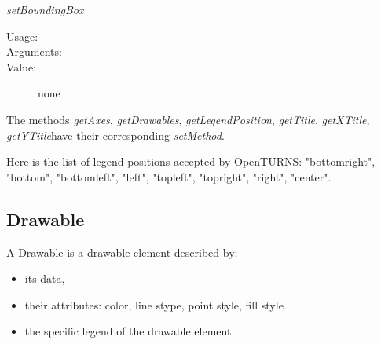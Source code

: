 \begin{description}
\begin{description}
  \item \textit{setBoundingBox}
    \begin{description}
    \item[Usage:] \rule{0pt}{1em}
    \item[Arguments:]  \rule{0pt}{1em}
    \item[Value:] none
    \end{description}
  \end{description}

  The methods \textit{getAxes}, \textit{getDrawables},  \textit{getLegendPosition},  \textit{getTitle},  \textit{getXTitle},  \textit{getYTitle}have their corresponding \textit{setMethod}.

\end{description}

Here is the list of legend positions accepted by OpenTURNS: "bottomright", "bottom", "bottomleft", "left", "topleft", "topright", "right", "center".


\newpage
\subsection{Drawable}

A Drawable is a  drawable element described by:
\begin{itemize}
\item its data,
\item their attributes: color, line stype, point style, fill style
\item the specific legend of the drawable element.
\end{itemize}


